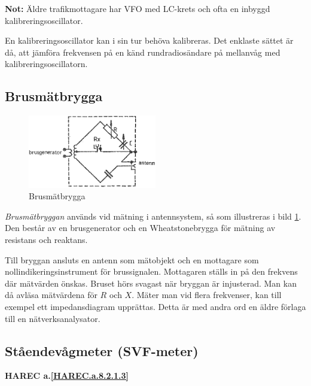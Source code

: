 \textbf{Not:}
Äldre trafikmottagare har VFO med LC-krets och ofta en inbyggd
kalibreringsoscillator.

En kalibreringsoscillator kan i sin tur behöva kalibreras.
Det enklaste sättet är då, att jämföra frekvensen på en känd rundradiosändare
på mellanvåg med kalibreringsoscillatorn.

\subsection{Brusmätbrygga}

\begin{figure}
  \includegraphics[width=0.5\textwidth]{images/cropped_pdfs/bild_2_8-08.pdf}
  \caption{Brusmätbrygga}
  \label{fig:bildII8-8}
\end{figure}

\emph{Brusmätbryggan} används vid mätning i antennsystem, så som illustreras i
bild \ref{fig:bildII8-8}.
Den består av en brusgenerator och en Wheatstonebrygga för mätning av
resistans och reaktans.

Till bryggan ansluts en antenn som mätobjekt och en mottagare som
nollindikeringsinstrument för brussignalen.
Mottagaren ställs in på den frekvens där mätvärden önskas.
Bruset hörs svagast när bryggan är injusterad.
Man kan då avläsa mätvärdena för \(R\) och \(X\).
Mäter man vid flera frekvenser, kan till exempel ett impedansdiagram upprättas.
Detta är med andra ord en äldre förlaga till en nätverksanalysator.

\subsection{Ståendevågmeter (SVF-meter)}
\textbf{
HAREC a.\ref{HAREC.a.8.2.1.3}\label{myHAREC.a.8.2.1.3}
}
\label{SVF}

